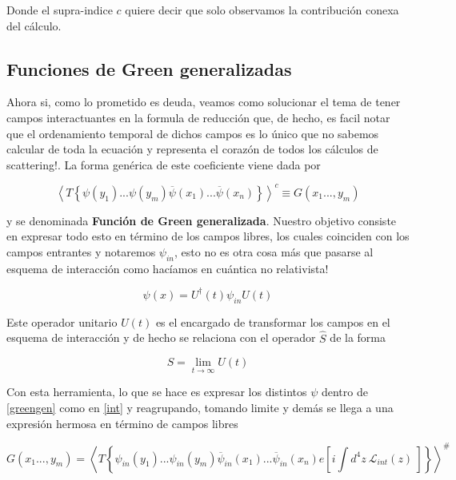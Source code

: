 \documentclass{article}
\numberwithin{equation}{section}
\begin{document}
Donde el supra-indice $ c $ quiere decir que solo observamos la contribución
conexa del cálculo. 

\subsection{Funciones de Green generalizadas}\label{sec_green}

Ahora si, como lo prometido es deuda, veamos como solucionar el tema de tener campos interactuantes en la formula de reducción que, de hecho, es facil notar que el ordenamiento temporal de dichos campos es lo único que no sabemos calcular de toda la ecuación y representa el corazón de todos los cálculos de scattering!. La forma genérica de este coeficiente viene dada por

\begin{equation}\label{greengen}
\left\langle T\left\{ \psi(y_{1})...\psi(y_{m})\overline{\psi}(x_{1})...\overline{\psi}(x_{n})\right\} \right\rangle ^{c}\equiv G(x_{1}...,y_{m})
\end{equation}

y se denominada \textbf{Función de Green generalizada}. Nuestro objetivo consiste en expresar todo esto en término de los campos libres,
los cuales coinciden con los campos entrantes y notaremos $\psi_{in}$, esto no es otra cosa más que pasarse al esquema de interacción como
hacíamos en cuántica no relativista!

\begin{equation}\label{int}
\psi(x)=U^{\dagger}(t)\psi_{in}U(t)
\end{equation}

Este operador unitario $ U(t) $ es el encargado de transformar los campos en el esquema de interacción y de hecho se relaciona con el operador $ \hat{S}$ de la forma 

\begin{equation}\label{key}
S=\lim_{t\rightarrow \infty} U(t)
\end{equation}

Con esta herramienta, lo que se hace es expresar los distintos $ \psi $ dentro de \ref{greengen}  como en \ref{int}  y reagrupando, tomando limite y demás se llega a una expresión hermosa en término de campos libres

\begin{equation}\label{green_generalizado}
G(x_{1}...,y_{m})=\left\langle T\left\{ \psi_{in}(y_{1})...\psi_{in}(y_{m})\overline{\psi}_{in}(x_{1})...\overline{\psi}_{in}(x_{n})e\left[i\int d^{4}z \ \mathcal{L}_{int}(z) \ \right]\right\} \right\rangle ^{\#}
\end{equation}
\end{document}
